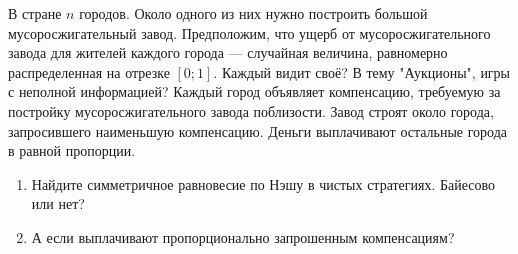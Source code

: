 \begin{problem}\par
В стране  $n$  городов. Около одного из них нужно построить большой мусоросжигательный завод. Предположим, что ущерб от мусоросжигательного завода для жителей каждого города --- случайная величина, равномерно распределенная на отрезке  $\left[0;1\right]$. {\red Каждый видит своё? В тему "Аукционы", игры с неполной информацией?} Каждый город объявляет компенсацию, требуемую за постройку мусоросжигательного завода поблизости. Завод строят около города, запросившего наименьшую компенсацию. Деньги выплачивают остальные города в равной пропорции.\par
\begin{enumerate}
\item Найдите симметричное равновесие по Нэшу в чистых стратегиях. {\red Байесово или нет?}
\item {\red А если выплачивают пропорционально запрошенным компенсациям?}
\end{enumerate}


\begin{sol}

\end{sol}
\end{problem}


